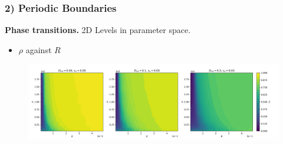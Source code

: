 \begin{frame}
	\frametitle{2) Periodic Boundaries}
	\textbf{Phase transitions.} 2D Levels in parameter space.
	\begin{itemize}
	    \item $\rho$ against $R$
	\end{itemize}
	\begin{figure}[H]
  		\includegraphics[width=\textwidth]{images/chapter2/rho_r_transition_2D_plots_D_comparison.png} 
	\end{figure}
\end{frame}